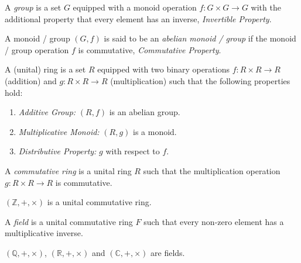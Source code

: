 \documentclass[11pt,fleqn]{book} %
\begin{document}
\begin{definition}[Group]
    A \emph{group} is a set $G$ equipped with a monoid operation $f: G \times G \to G$ with the additional property that every element has an inverse, \emph{Invertible Property}.
\end{definition}

\begin{definition}
    A monoid / group $(G, f)$ is said to be an \emph{abelian monoid / group} if the monoid / group operation $f$ is commutative, \emph{Commutative Property}.
\end{definition}

\begin{definition}
    A (unital) ring is a set $R$ equipped with two binary operations $f: R \times R \to R$ (addition) and $g: R \times R \to R$ (multiplication) such that the following properties hold:
    \begin{enumerate}
        \item \emph{Additive Group:} $(R, f)$ is an abelian group.
        \item \emph{Multiplicative Monoid:} $(R, g)$ is a monoid.
        \item \emph{Distributive Property:} $g$ with respect to $f$.
    \end{enumerate}
\end{definition}

\begin{definition}
    A \emph{commutative ring} is a unital ring $R$ such that the multiplication operation $g: R \times R \to R$ is commutative.
\end{definition}

\begin{example}
    $(\mathbb{Z}, +, \times)$ is a unital commutative ring.
\end{example}

\begin{definition}[Field]
    A \emph{field} is a unital commutative ring $F$ such that every non-zero element has a multiplicative inverse.
\end{definition}

\begin{example}
    $(\mathbb{Q}, +, \times)$, $(\mathbb{R}, +, \times)$ and $(\mathbb{C}, +, \times)$ are fields.
\end{example}

\newpage

\end{document}
